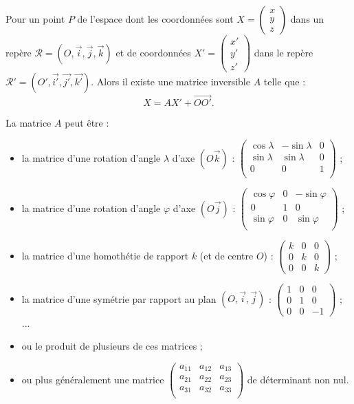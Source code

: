 \documentclass[class=report,crop=false]{standalone}
\newcommand{\vect}{\overrightarrow}
\begin{document}
\bigskip

Pour un point $P$ de l'espace dont les coordonnées sont 
$X= \left(\begin{smallmatrix}x\\y\\z\end{smallmatrix}\right)$
dans un repère $\mathcal{R} = (O,\vect{i},\vect{j},\vect{k})$ et 
de coordonnées $X' = \left(\begin{smallmatrix}x'\\y'\\z'\end{smallmatrix}\right)$
dans le repère $\mathcal{R}'= (O',\vect{i'},\vect{j'},\vect{k'})$. 
Alors il existe une matrice inversible $A$ telle que :
$$X = A X' + \vect{OO'}.$$

La matrice $A$ peut être :
\begin{itemize}
  \item la matrice d'une rotation d'angle $\lambda$ d'axe $(O\vect{k})$ :
$\begin{pmatrix}
\cos \lambda & -\sin \lambda & 0 \\
\sin \lambda & \sin \lambda  & 0 \\
0            & 0             & 1 \\
\end{pmatrix}$ ;
  \item la matrice d'une rotation d'angle $\varphi$ d'axe $(O\vect{j})$ :
$\begin{pmatrix}
\cos \varphi & 0 & -\sin \varphi \\
0            & 1 & 0 \\
\sin \varphi & 0 & \sin \varphi \\
\end{pmatrix}$ ;
  \item la matrice d'une homothétie de rapport $k$  (et de centre $O$) :
$\begin{pmatrix}k&0&0\\0&k&0\\0&0&k\end{pmatrix}$ ;
  \item la matrice d'une symétrie par rapport au plan $(O,\vect{i},\vect{j})$ :
  $\begin{pmatrix}1&0&0\\0&1&0\\0&0&-1\end{pmatrix}$ ; ...
  \item ou le produit de plusieurs de ces matrices ;
  \item ou plus généralement une matrice 
  $\begin{pmatrix}
  a_{11}&a_{12}&a_{13}\\
  a_{21}&a_{22}&a_{23}\\
  a_{31}&a_{32}&a_{33}\\
  \end{pmatrix}$ de déterminant non nul.
\end{itemize}
\end{document}
